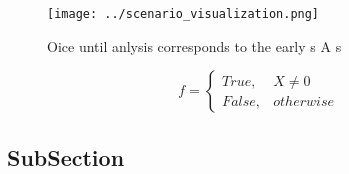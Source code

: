 \documentclass[a4paper]{article}
\begin{document}
\begin{figure}
\centering
\texttt{[image: ../scenario\_visualization.png]}
\caption{Oice until anlysis corresponds to the early s A s
}
\end{figure}
 
\begin{equation}   f =
\begin{cases} True, & X \neq 0\\
False, & otherwise
\end{cases}
\end{equation}

\subsection{SubSection}
\end{document}
